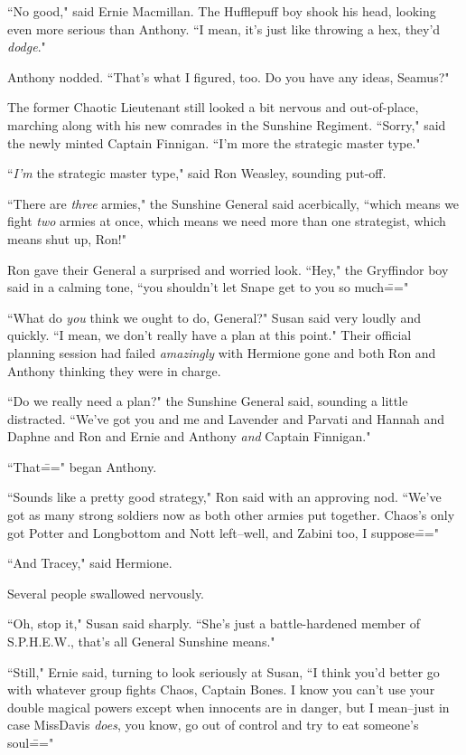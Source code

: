 ``No good," said Ernie Macmillan. The Hufflepuff boy shook his head, looking even more serious than Anthony. ``I mean, it's just like throwing a hex, they'd \emph{dodge}."

Anthony nodded. ``That's what I figured, too. Do you have any ideas, Seamus?"

The former Chaotic Lieutenant still looked a bit nervous and out-of-place, marching along with his new comrades in the Sunshine Regiment. ``Sorry," said the newly minted Captain Finnigan. ``I'm more the strategic master type."

``\emph{I'm} the strategic master type," said Ron Weasley, sounding put-off.

``There are \emph{three} armies," the Sunshine General said acerbically, ``which means we fight \emph{two} armies at once, which means we need more than one strategist, which means shut up, Ron!"

Ron gave their General a surprised and worried look. ``Hey," the Gryffindor boy said in a calming tone, ``you shouldn't let Snape get to you so much\==="

``What do \emph{you} think we ought to do, General?" Susan said very loudly and quickly. ``I mean, we don't really have a plan at this point." Their official planning session had failed \emph{amazingly} with Hermione gone and both Ron and Anthony thinking they were in charge.

``Do we really need a plan?" the Sunshine General said, sounding a little distracted. ``We've got you and me and Lavender and Parvati and Hannah and Daphne and Ron and Ernie and Anthony \emph{and} Captain Finnigan."

``That\===" began Anthony.

``Sounds like a pretty good strategy," Ron said with an approving nod. ``We've got as many strong soldiers now as both other armies put together. Chaos's only got Potter and Longbottom and Nott left\---well, and Zabini too, I suppose\==="

``And Tracey," said Hermione.

Several people swallowed nervously.

``Oh, stop it," Susan said sharply. ``She's just a battle-hardened member of S.P.H.E.W., that's all General Sunshine means."

``Still," Ernie said, turning to look seriously at Susan, ``I think you'd better go with whatever group fights Chaos, Captain Bones. I know you can't use your double magical powers except when innocents are in danger, but I mean\---just in case Miss\?Davis \emph{does}, you know, go out of control and try to eat someone's soul\==="

